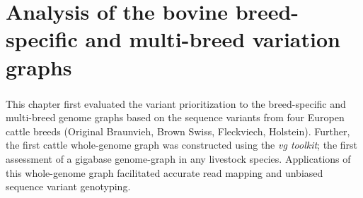 \documentclass[11 pt, a4paper, notitlepage, twoside]{report}
\begin{document}



\iftwoside
\cleardoublepage
\newpage
\fi



\chapter[Bovine whole-genome variation graphs]{\LARGE{Analysis of the bovine breed-specific and multi-breed variation graphs}}
\label{chap:wholegraph}

\subsection*{}
\normalsize
This chapter first evaluated the variant prioritization to the breed-specific and multi-breed genome graphs based on the sequence variants from four Europen cattle breeds (Original Braunvieh, Brown Swiss, Fleckviech, Holstein). Further, the first cattle whole-genome graph was constructed using the \emph{vg toolkit}; the first assessment of a gigabase genome-graph in any livestock species. Applications of this whole-genome graph facilitated accurate read mapping and unbiased sequence variant genotyping. \\


\bigskip

\begin{center}\end{center}

\end{document}
